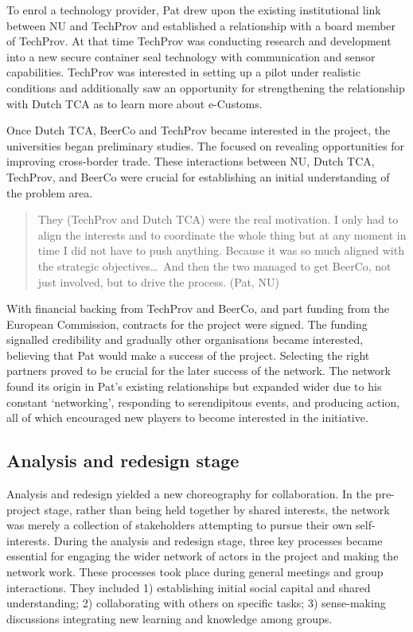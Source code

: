 \documentclass[graybox]{styles/svmult}
\begin{document}
To enrol a technology provider, Pat drew upon the existing institutional link between NU and TechProv and established a relationship with a board member of TechProv. At that time TechProv was conducting research and development into a new secure container seal technology with communication and sensor capabilities. TechProv was interested in setting up a pilot under realistic conditions and additionally saw an opportunity for strengthening the relationship with Dutch TCA as to learn more about e-Customs. 

Once Dutch TCA, BeerCo and TechProv became interested in the project, the universities began preliminary studies. 
The focused on revealing opportunities for improving cross-border trade. 
These interactions between NU, Dutch TCA, TechProv, and BeerCo were crucial for establishing an initial understanding of the problem area. 

\blockquote{They (TechProv and Dutch TCA) were the real motivation. I only had to align the interests and to coordinate the whole thing but at any moment in time I did not have to push anything. Because it was so much aligned with the strategic objectives\dots~And then the two managed to get BeerCo, not just involved, but to drive the process. (Pat, NU)}

With financial backing from TechProv and BeerCo, and part funding from the European Commission, contracts for the project were signed. 
The funding signalled credibility and gradually other organisations became interested, believing that Pat would make a success of the project. Selecting the right partners proved to be crucial for the later success of the network. The network found its origin in Pat's existing relationships but expanded wider due to his constant `networking', responding to serendipitous events, and producing action, all of which encouraged new players to become interested in the initiative. 


\subsection{Analysis and redesign stage}
Analysis and redesign yielded a new choreography for collaboration. In the pre-project stage, rather than being held together by shared interests, the network was merely a collection of stakeholders attempting to pursue their own self-interests. During the analysis and redesign stage, three key processes became essential for engaging the wider network of actors in the project and making the network work. These processes took place during general meetings and group interactions. They included 1) establishing initial social capital and shared understanding; 2) collaborating with others on specific tasks; 3) sense-making discussions integrating new learning and knowledge among groups. 
\end{document}
